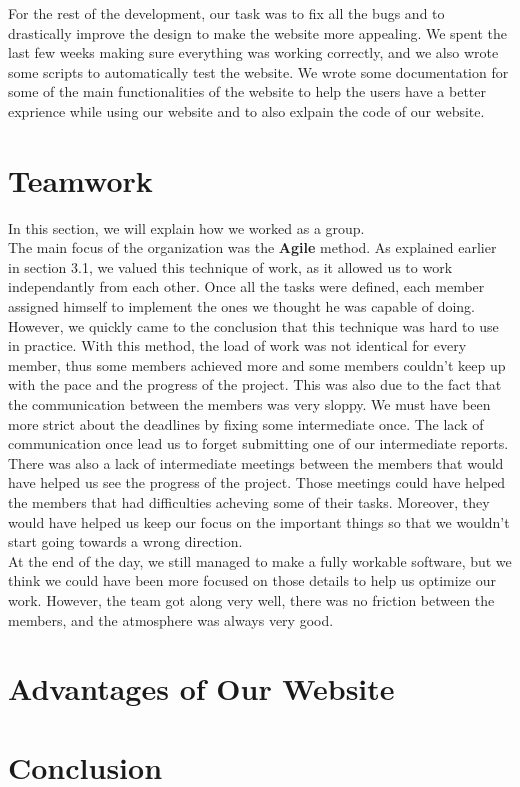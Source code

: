 \documentclass[a4paper, 12pt]{article}
\begin{document}
For the rest of the development, our task was to fix all the bugs and to drastically improve the design to make the website more appealing. We spent the last few weeks making sure everything was working correctly, and we also wrote some scripts to automatically test the website. We wrote some documentation for some of the main functionalities of the website to help the users have a better exprience while using our website and to also exlpain the code of our website.

\section{Teamwork}

In this section, we will explain how we worked as a group.\\

The main focus of the organization was the \textbf{Agile} method. As explained earlier in section 3.1, we valued this technique of work, as it allowed us to work independantly from each other. Once all the tasks were defined, each member assigned himself to implement the ones we thought he was capable of doing.\\

However, we quickly came to the conclusion that this technique was hard to use in practice. With this method, the load of work was not identical for every member, thus some members achieved more and some members couldn't keep up with the pace and the progress of the project. This was also due to the fact that the communication between the members was very sloppy. We must have been more strict about the deadlines by fixing some intermediate once. The lack of communication once lead us to forget submitting one of our intermediate reports.\\

There was also a lack of intermediate meetings between the members that would have helped us see the progress of the project. Those meetings could have helped the members that had difficulties acheving some of their tasks. Moreover, they would have helped us keep our focus on the important things so that we wouldn't start going towards a wrong direction. \\

At the end of the day, we still managed to make a fully workable software, but we think we could have been more focused on those details to help us optimize our work. However, the team got along very well, there was no friction between the members, and the atmosphere was always very good.\\

\section{Advantages of Our Website}

\section{Conclusion}
\end{document}
